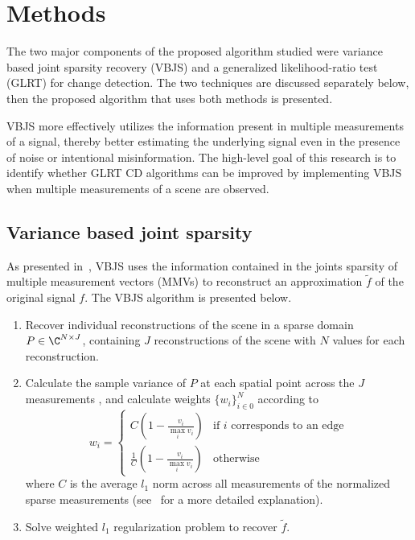 \documentclass{article}
\begin{document}
\section{Methods}

The two major components of the proposed algorithm studied were variance based joint sparsity recovery (VBJS) and a generalized likelihood-ratio test (GLRT) for change detection. The two techniques are discussed separately below, then the proposed algorithm that uses both methods is presented.

VBJS more effectively utilizes the information present in multiple measurements of a signal, thereby better estimating the underlying signal even in the presence of noise or intentional misinformation. The high-level goal of this research is to identify whether GLRT CD algorithms can be improved by implementing VBJS when multiple measurements of a scene are observed.

\subsection{Variance based joint sparsity}\label{subsec:vbjs}

As presented in~\cite{gelb_2018}, VBJS uses the information contained in the joints sparsity of multiple measurement vectors (MMVs) to reconstruct an approximation $\tilde{f}$ of the original signal $f$. The VBJS algorithm is presented below.

\begin{enumerate}
    \item Recover individual reconstructions of the scene in a sparse domain $P \in \C^{N\times J}$, containing $J$ reconstructions of the scene with $N$ values for each reconstruction.
    \item Calculate the sample variance of $P$ at each spatial point across the $J$ measurements%
    , and calculate weights $\{w_i\}_{i \in 0}^N$ according to
    \begin{equation}
        w_i = \begin{cases}
            C(1-\frac{v_i}{\max_i v_i}) & \text{if $i$ corresponds to an edge} \\
            \frac{1}{C}(1-\frac{v_i}{\max_i v_i}) & \text{otherwise}
    \end{cases}
    \end{equation}
    where $C$ is the average $l_1$ norm across all measurements of the normalized sparse measurements (see~\cite{gelb_2018} for a more detailed explanation).
    \item Solve weighted $l_1$ regularization problem to recover $\tilde{f}$.
\end{enumerate}
\end{document}
